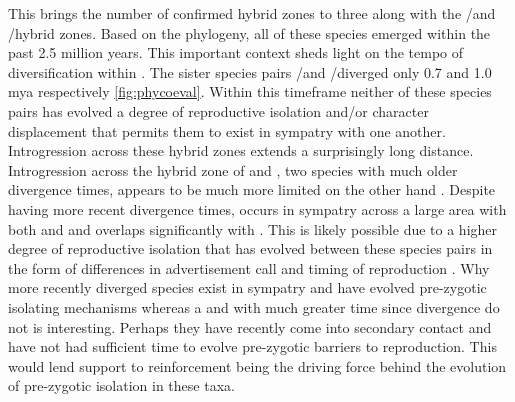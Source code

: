 This brings the number of confirmed \anaxyrus hybrid zones to three along with 
the \amer/\terr and \amer/\hemiophrys hybrid zones. 
Based on the \phycoeval phylogeny, all of these species emerged within the past 
2.5 million years.
This important context sheds light on the tempo of diversification within \anaxyrus.
The sister species pairs \fowl/\wood and \amer/\terr diverged only 0.7 and 1.0 mya
respectively \cref{fig:phycoeval}.
Within this timeframe neither of these species pairs has evolved a degree of 
reproductive isolation and/or character displacement that permits them to exist 
in sympatry with one another. 
Introgression across these hybrid zones extends a surprisingly long distance.
Introgression across the hybrid zone of \amer and \hemiophrys, two species with 
much older divergence times, appears to be much more limited on the other hand \parencite{green1983}. 
Despite having more recent divergence times, \fowl occurs in sympatry across 
a large area with both \amer and \terr and \wood overlaps significantly with 
\amer \parencite{conant1998}.
This is likely possible due to a higher degree of reproductive isolation that 
has evolved between these species pairs in the form of differences in 
advertisement call and timing of reproduction \parencite{blair1974}. 
Why more recently diverged species exist in sympatry and have evolved 
pre-zygotic isolating mechanisms whereas a \amer and \hemiophrys with much 
greater time since divergence do not is interesting.
Perhaps they have recently come into secondary contact and have not had sufficient
time to evolve pre-zygotic barriers to reproduction. 
This would lend support to reinforcement being the driving force behind the evolution
of pre-zygotic isolation in these taxa. 

